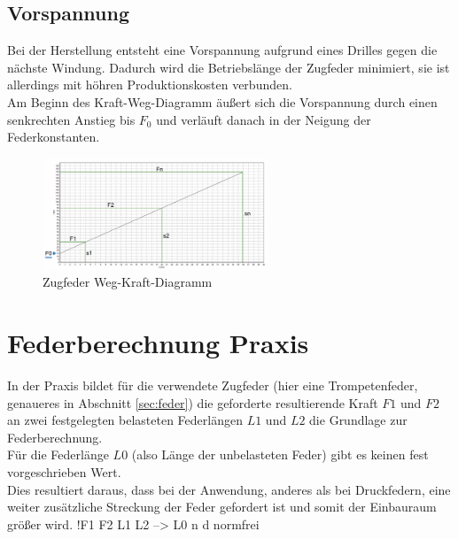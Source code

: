 \subsection{Vorspannung}
Bei der Herstellung entsteht eine Vorspannung aufgrund eines Drilles gegen die nächste
Windung. Dadurch wird die Betriebslänge der Zugfeder minimiert, sie ist allerdings mit höhren Produktionskosten
verbunden.\\
Am Beginn des Kraft-Weg-Diagramm äußert sich die Vorspannung durch einen senkrechten Anstieg
bis $F_0$ und verläuft danach in der Neigung der Federkonstanten.  
\begin{figure}[H]
    \centering
    \includegraphics[width=0.6\textwidth]{bilder/Input/Vorspannung.jpg}
    \caption{Zugfeder Weg-Kraft-Diagramm \cite{KompZ}}
\end{figure}
\newpage
\section{Federberechnung Praxis}

    In der Praxis bildet für die verwendete Zugfeder (hier eine Trompetenfeder, genaueres in Abschnitt \ref{sec:feder})
    die geforderte resultierende Kraft $F1$ und $F2$ an zwei festgelegten belasteten Federlängen $L1$ und $L2$
    die Grundlage zur Federberechnung.\\

    Für die Federlänge $L0$ (also Länge der unbelasteten Feder) gibt es keinen fest vorgeschrieben Wert.\\
    Dies resultiert daraus, dass bei der Anwendung, anderes als bei Druckfedern, eine weiter zusätzliche Streckung
    der Feder gefordert ist und somit der Einbauraum größer wird.
    !F1 F2 L1 L2 --> L0 n d normfrei\newline


